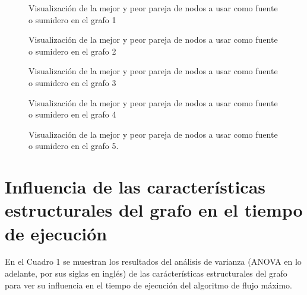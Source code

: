\documentclass{article}
\begin{document}
\begin{figure}[htbp]
\caption{Visualización de la mejor y peor pareja de nodos a usar como fuente o sumidero en el grafo 1}
\label{Flujo1} 
\end{figure}

\begin{figure}[htbp]
\caption{Visualización de la mejor y peor pareja de nodos a usar como fuente o sumidero en el grafo 2}
\label{Flujo2} 
\end{figure}

\begin{figure}[htbp]
\caption{Visualización de la mejor y peor pareja de nodos a usar como fuente o sumidero en el grafo 3}
\label{Flujo3} 
\end{figure}

\begin{figure}[htbp]
\caption{Visualización de la mejor y peor pareja de nodos a usar como fuente o sumidero en el grafo 4}
\label{Flujo4} 
\end{figure}


\begin{figure}[htbp]
\caption{Visualización de la mejor y peor pareja de nodos a usar como fuente o sumidero en el grafo 5.}
\label{Flujo5} 
\end{figure}

\section*{Influencia de las características estructurales del grafo en el tiempo de ejecución}


En el Cuadro 1 se muestran los resultados del análisis de varianza (ANOVA en lo adelante, por sus siglas en inglés) de las carácterísticas estructurales del grafo para ver su influencia en el tiempo de ejecución del algoritmo de flujo máximo.
\end{document}
